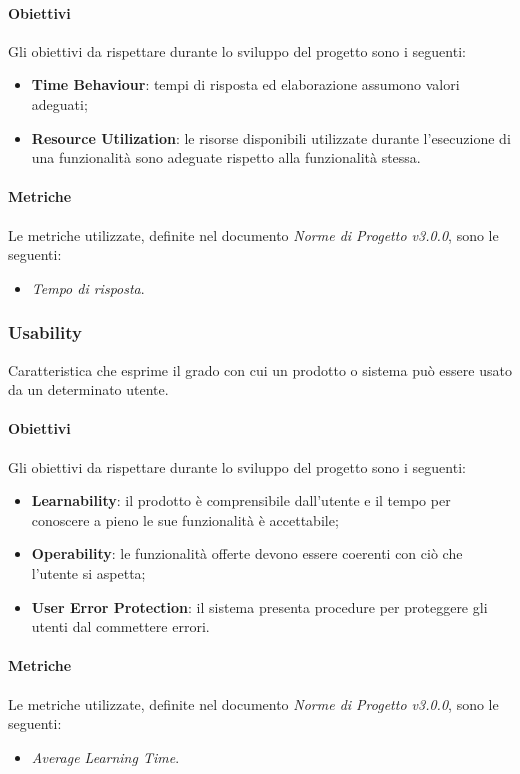\paragraph{Obiettivi} \Spazio
Gli obiettivi da rispettare durante lo sviluppo del progetto sono i seguenti:
	\begin{itemize}
			\item{\textbf{Time Behaviour}: tempi di risposta ed elaborazione assumono valori adeguati;
			}
			\item{\textbf{Resource Utilization}: le risorse disponibili utilizzate durante l'esecuzione di una funzionalità sono adeguate rispetto alla funzionalità stessa.
			}
	\end{itemize}

\paragraph{Metriche} \Spazio
Le metriche utilizzate, definite nel documento \emph{Norme di Progetto v3.0.0}, sono le seguenti:
	\begin{itemize}
		\item{\emph{Tempo di risposta}.}
	\end{itemize}

\subsubsection{Usability} 
	Caratteristica che esprime il grado con cui un prodotto o sistema può essere usato da un determinato utente.
\paragraph{Obiettivi} \Spazio
Gli obiettivi da rispettare durante lo sviluppo del progetto sono i seguenti:
	\begin{itemize}
		\item{\textbf{Learnability}: il prodotto è comprensibile dall'utente e il tempo per conoscere a pieno le sue funzionalità è accettabile;
		}
		\item{\textbf{Operability}: le funzionalità offerte devono essere coerenti con ciò che l'utente si aspetta;
		}
		\item{\textbf{User Error Protection}: il sistema presenta procedure per proteggere gli utenti dal commettere errori.
		}
	\end{itemize}
\paragraph{Metriche} \Spazio
Le metriche utilizzate, definite nel documento \emph{Norme di Progetto v3.0.0}, sono le seguenti:
	\begin{itemize}
		\item{\emph{Average Learning Time}.}
	\end{itemize}

